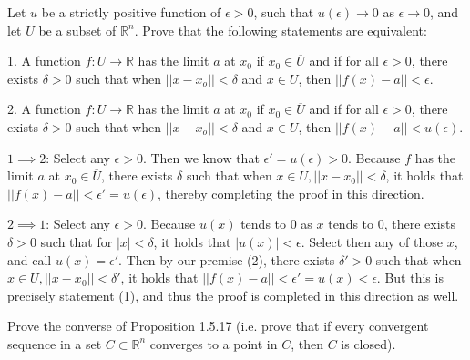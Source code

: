 \begin{exercise}{12}
    Let $u$ be a strictly positive function of $\epsilon > 0$, such that $u(\epsilon) \rightarrow 0$ as $\epsilon \rightarrow 0$, and let $U$ be a subset of $\mathbb{R}^n$. Prove that the following statements are equivalent:

    1. A function $f: U \rightarrow \mathbb{R}$ has the limit $a$ at $x_0$ if $x_0 \in \overline{U}$ and if for all $\epsilon > 0$, there exists $\delta > 0$ such that when $\lvert \lvert x - x_o \rvert \rvert < \delta$ and $x \in U$, then $\lvert \lvert f(x) - a \rvert \rvert < \epsilon$.

    2. A function $f: U \rightarrow \mathbb{R}$ has the limit $a$ at $x_0$ if $x_0 \in \overline{U}$ and if for all $\epsilon > 0$, there exists $\delta > 0$ such that when $\lvert \lvert x - x_o \rvert \rvert < \delta$ and $x \in U$, then $\lvert \lvert f(x) - a \rvert \rvert < u(\epsilon)$.
\end{exercise}

\begin{solution}

    $1 \implies 2$: Select any $\epsilon > 0$. Then we know that $\epsilon' = u(\epsilon) > 0$. Because $f$ has the limit $a$ at $x_0 \in \overline{U}$, there exists $\delta$ such that when $x \in U, \lvert \lvert x - x_0 \rvert \rvert < \delta$, it holds that $\lvert \lvert f(x) - a \rvert \rvert < \epsilon' = u(\epsilon)$, thereby completing the proof in this direction.

    $2 \implies 1$: Select any $\epsilon > 0$. Because $u(x)$ tends to 0 as $x$ tends to 0, there exists $\delta > 0$ such that for $\lvert x \rvert < \delta$, it holds that $\lvert u(x) \rvert < \epsilon$. Select then any of those $x$, and call $u(x) = \epsilon'$. Then by our premise (2), there exists $\delta' > 0$ such that when $x \in U, \lvert \lvert x - x_0 \rvert \rvert < \delta'$, it holds that $\lvert \lvert f(x) - a \rvert \rvert < \epsilon' = u(x) < \epsilon$. But this is precisely statement (1), and thus the proof is completed in this direction as well.
\end{solution}

\begin{exercise}{13}
    Prove the converse of Proposition 1.5.17 (i.e. prove that if every convergent sequence in a set $C \subset \mathbb{R}^n$ converges to a point in $C$, then $C$ is closed).
\end{exercise}

